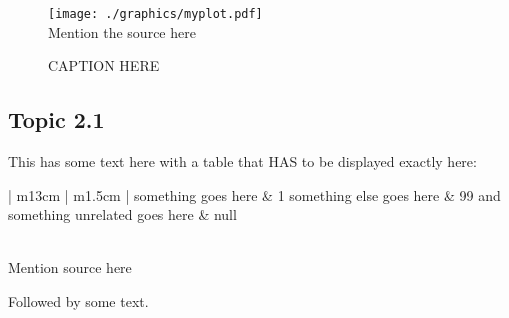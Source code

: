 \documentclass[12pt,a4paper]{article}
\begin{document}
	\begin{figure}
		\centering
		\caption{CAPTION HERE}
		\texttt{[image: ./graphics/myplot.pdf]}\\
		\label{fig:f1}
		\footnotesize{Mention the source here \citet{acroname}}
	\end{figure}

	\subsection{Topic 2.1}
	This has some text here with a table that HAS to be displayed exactly here:

	\begin{table}[H] %
		\centering
		\caption{Caption}
		\begin{tabular}{| m{13cm} | m{1.5cm} |} %
			\hline
			something goes here & 1%
			something else goes here & 99%
			\hline
			and something unrelated goes here & null \\
			\hline
		\end{tabular}\\[10pt]
		\footnotesize{Mention source here}
		\label{table:ProbDez} %
	\end{table}

	Followed by some text.

	\newpage %

	\renewcommand{\thepage}{\Roman{page}}
	\setcounter{page}{5}
\end{document}
